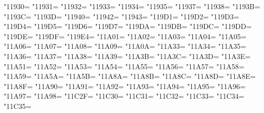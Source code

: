 \XeTeXcharclass"11930=\KclassCM
\XeTeXcharclass"11931=\KclassCM
\XeTeXcharclass"11932=\KclassCM
\XeTeXcharclass"11933=\KclassCM
\XeTeXcharclass"11934=\KclassCM
\XeTeXcharclass"11935=\KclassCM
\XeTeXcharclass"11937=\KclassCM
\XeTeXcharclass"11938=\KclassCM
\XeTeXcharclass"1193B=\KclassCM
\XeTeXcharclass"1193C=\KclassCM
\XeTeXcharclass"1193D=\KclassCM
\XeTeXcharclass"11940=\KclassCM
\XeTeXcharclass"11942=\KclassCM
\XeTeXcharclass"11943=\KclassCM
\XeTeXcharclass"119D1=\KclassCM
\XeTeXcharclass"119D2=\KclassCM
\XeTeXcharclass"119D3=\KclassCM
\XeTeXcharclass"119D4=\KclassCM
\XeTeXcharclass"119D5=\KclassCM
\XeTeXcharclass"119D6=\KclassCM
\XeTeXcharclass"119D7=\KclassCM
\XeTeXcharclass"119DA=\KclassCM
\XeTeXcharclass"119DB=\KclassCM
\XeTeXcharclass"119DC=\KclassCM
\XeTeXcharclass"119DD=\KclassCM
\XeTeXcharclass"119DE=\KclassCM
\XeTeXcharclass"119DF=\KclassCM
\XeTeXcharclass"119E4=\KclassCM
\XeTeXcharclass"11A01=\KclassCM
\XeTeXcharclass"11A02=\KclassCM
\XeTeXcharclass"11A03=\KclassCM
\XeTeXcharclass"11A04=\KclassCM
\XeTeXcharclass"11A05=\KclassCM
\XeTeXcharclass"11A06=\KclassCM
\XeTeXcharclass"11A07=\KclassCM
\XeTeXcharclass"11A08=\KclassCM
\XeTeXcharclass"11A09=\KclassCM
\XeTeXcharclass"11A0A=\KclassCM
\XeTeXcharclass"11A33=\KclassCM
\XeTeXcharclass"11A34=\KclassCM
\XeTeXcharclass"11A35=\KclassCM
\XeTeXcharclass"11A36=\KclassCM
\XeTeXcharclass"11A37=\KclassCM
\XeTeXcharclass"11A38=\KclassCM
\XeTeXcharclass"11A39=\KclassCM
\XeTeXcharclass"11A3B=\KclassCM
\XeTeXcharclass"11A3C=\KclassCM
\XeTeXcharclass"11A3D=\KclassCM
\XeTeXcharclass"11A3E=\KclassCM
\XeTeXcharclass"11A51=\KclassCM
\XeTeXcharclass"11A52=\KclassCM
\XeTeXcharclass"11A53=\KclassCM
\XeTeXcharclass"11A54=\KclassCM
\XeTeXcharclass"11A55=\KclassCM
\XeTeXcharclass"11A56=\KclassCM
\XeTeXcharclass"11A57=\KclassCM
\XeTeXcharclass"11A58=\KclassCM
\XeTeXcharclass"11A59=\KclassCM
\XeTeXcharclass"11A5A=\KclassCM
\XeTeXcharclass"11A5B=\KclassCM
\XeTeXcharclass"11A8A=\KclassCM
\XeTeXcharclass"11A8B=\KclassCM
\XeTeXcharclass"11A8C=\KclassCM
\XeTeXcharclass"11A8D=\KclassCM
\XeTeXcharclass"11A8E=\KclassCM
\XeTeXcharclass"11A8F=\KclassCM
\XeTeXcharclass"11A90=\KclassCM
\XeTeXcharclass"11A91=\KclassCM
\XeTeXcharclass"11A92=\KclassCM
\XeTeXcharclass"11A93=\KclassCM
\XeTeXcharclass"11A94=\KclassCM
\XeTeXcharclass"11A95=\KclassCM
\XeTeXcharclass"11A96=\KclassCM
\XeTeXcharclass"11A97=\KclassCM
\XeTeXcharclass"11A98=\KclassCM
\XeTeXcharclass"11C2F=\KclassCM
\XeTeXcharclass"11C30=\KclassCM
\XeTeXcharclass"11C31=\KclassCM
\XeTeXcharclass"11C32=\KclassCM
\XeTeXcharclass"11C33=\KclassCM
\XeTeXcharclass"11C34=\KclassCM
\XeTeXcharclass"11C35=\KclassCM
